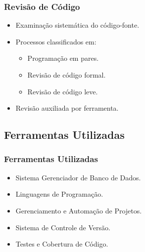 \frame
{
\frametitle{Revisão de Código}
\begin{itemize}
	\item Examinação sistemática do código-fonte.
	\item Processos classificados em:
	\begin{itemize}
		\item Programação em pares.
		\item Revisão de código formal.
		\item Revisão de código leve.
	\end{itemize}
	\item Revisão auxiliada por ferramenta.
\end{itemize}
}

\subsection{Ferramentas Utilizadas}
\frame
{
\frametitle{Ferramentas Utilizadas}
\begin{itemize}
	\item Sistema Gerenciador de Banco de Dados.
	\item Linguagens de Programação.
	\item Gerenciamento e Automação de Projetos.
	\item Sistema de Controle de Versão.
	\item Testes e Cobertura de Código.
\end{itemize}
}

